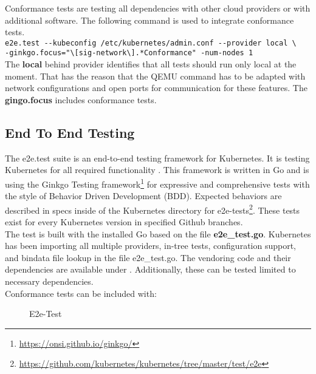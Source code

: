Conformance tests are testing all dependencies with other cloud providers or with additional software. The following command is used to integrate conformance tests. \\
\verb+e2e.test --kubeconfig /etc/kubernetes/admin.conf --provider local \+ \\
\verb+-ginkgo.focus="\[sig-network\].*Conformance" -num-nodes 1+  \\
The \textbf{local} behind provider identifies that all tests should run only local at the moment. That has the reason that the \gls{QEMU} command has to be adapted with network configurations and open ports for communication for these features.
The \textbf{gingo.focus} includes conformance tests.


\subsection{End To End Testing}
The e2e.test suite is an end-to-end testing framework for Kubernetes. It is testing Kubernetes for all required functionality \cite{Ohly2019}. This framework is written in Go and is using the Ginkgo Testing framework\footnote{\url{https://onsi.github.io/ginkgo/}} for expressive and comprehensive tests with the style of Behavior Driven Development (BDD).
Expected behaviors are described in specs inside of the Kubernetes directory for e2e-tests\footnote{\url{https://github.com/kubernetes/kubernetes/tree/master/test/e2e}}. These tests exist for every Kubernetes version in specified Github branches. \\
The test is built with the installed Go based on the file \textbf{e2e\_test.go}. Kubernetes has been importing all multiple providers, in-tree tests, configuration support, and bindata file lookup in the file e2e\_test.go.
The vendoring code and their dependencies are available under . Additionally, these can be tested limited to necessary dependencies. \\
Conformance tests can be included with: \\
\begin{figure}[H]
\centering
{}
 \caption{E2e-Test}
    \label{e2e-test}
\end{figure}

